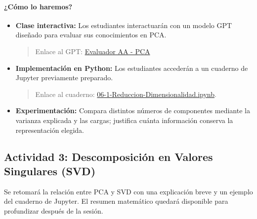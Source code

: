 \documentclass[a4,11pt]{aleph-notas}
\begin{document}
\paragraph{¿Cómo lo haremos?}  
\begin{itemize}[leftmargin=*]
    \item \textbf{Clase interactiva:}  
    Los estudiantes interactuarán con un modelo GPT diseñado para evaluar sus conocimientos en PCA.
    \begin{quote}
        Enlace al GPT: \href{https://chatgpt.com/g/g-674f7cde85ac81918e2a05a692ae0ee9-evluador-aa-pca}{Evaluador AA - PCA}
    \end{quote}
    
    \item \textbf{Implementación en Python:} Los estudiantes accederán a un cuaderno de Jupyter previamente preparado.
    \begin{quote}
        Enlace al cuaderno: \href{https://github.com/andres-merino/AprendizajeAutomaticoInicial-05-N0105/blob/main/2-Notebooks/06-1-Reduccion-Dimensionalidad.ipynb}{06-1-Reduccion-Dimensionalidad.ipynb}.
    \end{quote}
    
    \item \textbf{Experimentación:} Compara distintos números de componentes mediante la varianza explicada y las cargas; justifica cuánta información conserva la representación elegida.
    
\end{itemize}

\subsection*{Actividad 3: Descomposición en Valores Singulares (SVD)}

Se retomará la relación entre PCA y SVD con una explicación breve y un ejemplo del cuaderno de Jupyter. El resumen matemático quedará disponible para profundizar después de la sesión.
\end{document}
